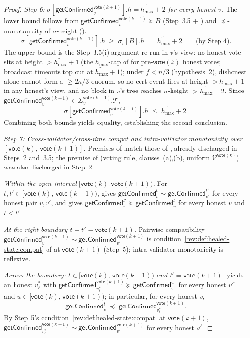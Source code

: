 \ifx\litemode\undefined\documentclass{article}\fi
\newcommand{\T}[0]{\ensuremath{\mathcal{T}}}
\newcommand{\V}[0]{\ensuremath{\mathcal{V}}}
\newcommand{\hmax}{\ensuremath{h_{\max}}\xspace}
\newcommand{\vote}{\ensuremath{\mathsf{vote}}}
\newcommand{\comm}[1]{\ensuremath{\widetilde{#1}}}
\newcommand{\getConfirmed}{\textsf{getConfirmed}\xspace}
\theoremstyle{plain}
\theoremstyle{definition}
\theoremstyle{remark}
\begin{document}
\begin{proof}
\emph{Step 6: $\sigma[\getConfirmed_v^{\vote(k+1)}].h = \comm{\hmax}+2$ for every honest $v$.}
The lower bound follows from $\getConfirmed_v^{\vote(k+1)} \succeq B$ (Step~3.5 + ) and $\preceq$-monotonicity of $\sigma$-height ():
\[
  \sigma[\getConfirmed_v^{\vote(k+1)}].h \;\geq\; \sigma_v[B].h \;=\; \comm{\hmax}+2 \qquad \text{(by Step~4)}.
\]
The upper bound is the Step~3.5(i) argument re-run in $v$'s view: no honest vote sits at height $> \comm{\hmax}+1$ (the $\hmax$-cap of  for pre-$\vote(k)$ honest votes; broadcast timeouts top out at $\comm{\hmax}+1$); under $f<n/3$ (hypothesis~2), dishonest alone cannot form a $\geq 2n/3$ quorum, so no cert event fires at height $> \comm{\hmax}+1$ in any honest's view, and no block in $v$'s tree reaches $\sigma$-height $> \comm{\hmax}+2$. Since $\getConfirmed_v^{\vote(k+1)} \in \Sigma_v^{\vote(k+1)}.\T$,
\[
  \sigma[\getConfirmed_v^{\vote(k+1)}].h \;\leq\; \comm{\hmax}+2.
\]
Combining both bounds yields equality, establishing the second conclusion.

\emph{Step 7: Cross-validator/cross-time compat and intra-validator monotonicity over $[\vote(k),\, \vote(k+1)]$.}
Premises of  match those of , already discharged in Steps~2 and~3.5; the premise of  (voting rule, clauses~(a),(b), uniform $\V^{\vote(k)}$) was also discharged in Step~2.

\emph{Within the open interval $[\vote(k), \vote(k+1))$.}
For $t, t' \in [\vote(k),\, \vote(k+1))$,  gives $\getConfirmed_v^{t} \sim \getConfirmed_{v'}^{t'}$ for every honest pair $v, v'$, and  gives $\getConfirmed_v^{t'} \succeq \getConfirmed_v^{t}$ for every honest $v$ and $t \leq t'$.

\emph{At the right boundary $t = t' = \vote(k+1)$.}
Pairwise compatibility $\getConfirmed_v^{\vote(k+1)} \sim \getConfirmed_{v'}^{\vote(k+1)}$ is condition~\ref{rev:def:healed-state:compat} of  at $\vote(k+1)$ (Step~5); intra-validator monotonicity is reflexive.

\emph{Across the boundary: $t \in [\vote(k),\, \vote(k+1))$ and $t' = \vote(k+1)$.}
 yields an honest $v_\ell^{\ast}$ with $\getConfirmed_{v_\ell^{\ast}}^{\vote(k+1)} \succeq \getConfirmed_{v''}^{u}$ for every honest $v''$ and $u \in [\vote(k),\, \vote(k+1))$; in particular, for every honest $v$,
\[
  \getConfirmed_v^{t} \;\preceq\; \getConfirmed_{v_\ell^{\ast}}^{\vote(k+1)}.
\]
By Step~5's condition~\ref{rev:def:healed-state:compat} at $\vote(k+1)$, $\getConfirmed_{v_\ell^{\ast}}^{\vote(k+1)} \sim \getConfirmed_{v'}^{\vote(k+1)}$ for every honest $v'$.


\end{proof}
\end{document}
